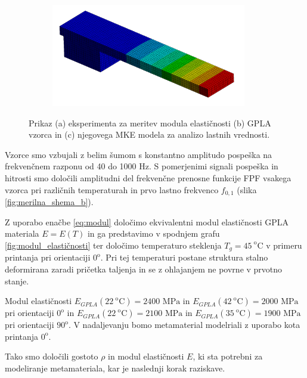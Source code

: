 \begin{figure}[!htb]
{{\begin{subfigure}{.45\textwidth}
                \centering
                \includegraphics[height=4.5cm,width=\textwidth]{Magisterski praktikum/slike/metodologija/MKE_E_modul.png}
                \caption{}
                \label{fig:MKE_vzorca}
                \end{subfigure}%
              }\cr
            }
            \caption{Prikaz (a) eksperimenta za meritev modula elastičnosti (b) GPLA vzorca in (c) njegovega MKE modela za analizo lastnih vrednosti.}
            \end{figure}
            
            
            \newpage
            
            Vzorce smo vzbujali z belim šumom s konstantno amplitudo pospeška na frekvenčnem razponu od 40 do 1000 Hz. S pomerjenimi signali pospeška in hitrosti smo določili amplitudni del frekvenčne prenosne funkcije FPF vsakega vzorca pri različnih temperaturah in prvo lastno frekvenco $f_{0,1}$ (slika \ref{fig:merilna_shema_b}).  
            
            Z uporabo enačbe \eqref{eq:modul} določimo ekvivalentni modul elastičnosti GPLA materiala $E=E(T)$ in ga predstavimo v spodnjem grafu \ref{fig:modul_elastičnosti} ter določimo temperaturo steklenja $T_g=45 ^\text{ o}$C v primeru printanja pri orientaciji $0^\text{o}$. Pri tej temperaturi postane struktura stalno deformirana zaradi pričetka taljenja in se z ohlajanjem ne povrne v prvotno stanje. 
            
            Modul elastičnosti $E_{GPLA}(22^\text{ o}\text{C})=2400\text{ MPa}$ in $E_{GPLA}(42^\text{ o}\text{C})=2000\text{ MPa}$ pri orientaciji $0^\text{o}$ in  $E_{GPLA}(22^\text{ o}\text{C})=2100\text{ MPa}$ in $E_{GPLA}(35^\text{ o}\text{C})=1900\text{ MPa}$ pri orientaciji $90^\text{o}$. V nadaljevanju bomo metamaterial modelriali z uporabo kota printanja $0^\text{o}$.
            
            Tako smo določili gostoto $\rho$ in modul elastičnosti $E$, ki sta potrebni za modeliranje metamateriala, kar je naslednji korak raziskave.
            
